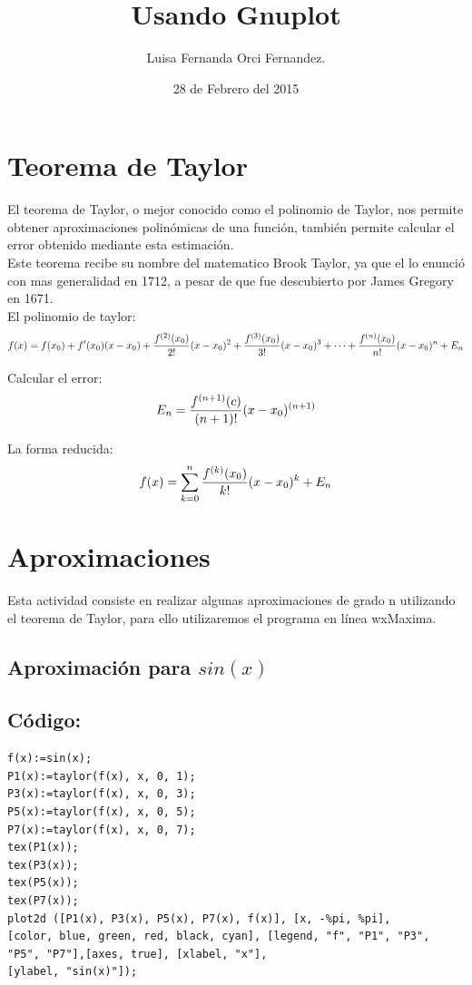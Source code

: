 \documentclass[10pt]{article}
\title{Usando Gnuplot}
\author{Luisa Fernanda Orci Fernandez.}
\date{28 de Febrero del 2015}
\begin{document}
\maketitle
\section{Teorema de Taylor}
El teorema de Taylor, o mejor conocido como el polinomio de Taylor, nos permite obtener aproximaciones polinómicas de una función, también permite calcular el error obtenido mediante esta estimación.\\
Este teorema recibe su nombre del matematico Brook Taylor, ya que el lo enunció con mas generalidad en 1712, a pesar de que fue descubierto por James Gregory en 1671.\\

El polinomio de taylor: 
$$f(x) = f(x_0)+f'(x_0)(x-x_0)+{{f^{(2)}(x_0)}\over{2!}}{{(x-x_0)^2}}+{{f^{(3)}(x_0)}\over{3!}}{{(x-x_0)^3}}+\cdots +{{f^{(n)}(x_0)}\over{n!}}{{(x-x_0)^n}} + E_{n} $$

Calcular el error:
$$ E_n = {{f^{(n+1)}(c)}\over{(n+1)!}}{{(x-x_0)^{(n+1)}}} $$

La forma reducida: 
$$ f(x) = \sum_{k=0}^n {{f^{(k)}(x_0)}\over{k!}}{{(x-x_0)^{k}}} + E_n$$

\section{Aproximaciones}
Esta actividad consiste en realizar algunas aproximaciones de grado n utilizando el teorema de Taylor, para ello utilizaremos el programa en línea wxMaxima.

\newpage

\subsection{Aproximación para $sin(x)$}
\subsection*{Código:}
\begin{verbatim}
f(x):=sin(x);
P1(x):=taylor(f(x), x, 0, 1);
P3(x):=taylor(f(x), x, 0, 3);
P5(x):=taylor(f(x), x, 0, 5);
P7(x):=taylor(f(x), x, 0, 7);
tex(P1(x));
tex(P3(x));
tex(P5(x));
tex(P7(x));
plot2d ([P1(x), P3(x), P5(x), P7(x), f(x)], [x, -%pi, %pi],
[color, blue, green, red, black, cyan], [legend, "f", "P1", "P3", "P5", "P7"],[axes, true], [xlabel, "x"], 
[ylabel, "sin(x)"]);
\end{verbatim}
\end{document}
